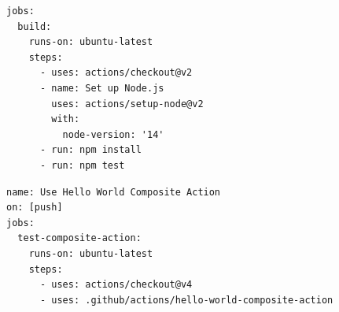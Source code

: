 \begin{minipage}[t]{0.48\linewidth}
\begin{lstlisting}[basicstyle=\ttfamily\scriptsize,caption={ID 28: GPT-4o candidate.},label={lst:workflow28}]
jobs:
  build:
    runs-on: ubuntu-latest
    steps:
      - uses: actions/checkout@v2
      - name: Set up Node.js
        uses: actions/setup-node@v2
        with:
          node-version: '14'
      - run: npm install
      - run: npm test
\end{lstlisting}
\end{minipage}\hfill\begin{minipage}[t]{0.48\linewidth}
\begin{lstlisting}[basicstyle=\ttfamily\scriptsize,caption={ID 42: GPT-4.1 candidate.},label={lst:workflow42}]
name: Use Hello World Composite Action
on: [push]
jobs:
  test-composite-action:
    runs-on: ubuntu-latest
    steps:
      - uses: actions/checkout@v4
      - uses: .github/actions/hello-world-composite-action
\end{lstlisting}
\end{minipage}
